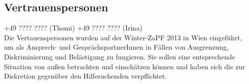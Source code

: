 \subsection{Vertrauenspersonen}
\faPhone \quad \quad +49 ???? ???? (Thomi) \quad \quad +49 ???? ???? (Irina)\\%

\noindent Die Vertauenspersonen wurden auf der Winter-ZaPF 2013 in Wien eingeführt, um als Ansprech- und GesprächspartnerInnen in Fällen von Ausgrenzung, Diskriminierung und Belästigung zu fungieren. Sie sollen eine entsprechende Situation von außen betrachten und einschätzen können und haben sich die zur Diskretion gegenüber den Hilfesuchenden verpflichtet.
